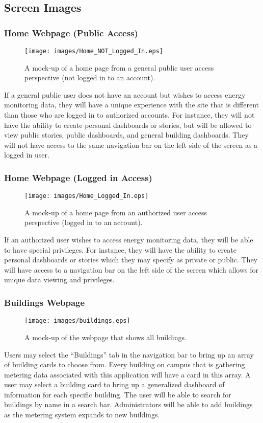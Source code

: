 \documentclass[journal,10pt,onecolumn,compsoc]{IEEEtran}
\begin{document}
	
    \subsection{Screen Images}
    
	\subsubsection{Home Webpage (Public Access)}
    \begin{figure}[H]
        \centering
        \texttt{[image: images/Home\_NOT\_Logged\_In.eps]}
        \caption{A mock-up of a home page from a general public user access perspective (not logged in to an account).}
    \end{figure}
	If a general public user does not have an account but wishes to access energy monitoring data, they will
	have a unique experience with the site that is different than those who are logged in to authorized accounts. 
	For instance, they will not have the ability to create personal dashboards or stories, but will be allowed to view
	public stories, public dashboards, and general building dashboards. They will not have access to the same navigation 
	bar on the left side of the screen as a logged in user. 
	
	\subsubsection{Home Webpage (Logged in Access)}
    \begin{figure}[H]
        \centering
        \texttt{[image: images/Home\_Logged\_In.eps]}
        \caption{A mock-up of a home page from an authorized user access perspective (logged in to an account).}
    \end{figure}
	If an authorized user wishes to access energy monitoring data, they will be able to have special privileges.
	For instance, they will have the ability to create personal dashboards or stories which they may specify as private or public.
	They will have access to a navigation bar on the left side of the screen which allows for unique data viewing and privileges. 
	
	
    \subsubsection{Buildings Webpage} 
    \begin{figure}[H]
        \centering
        \texttt{[image: images/buildings.eps]}
        \caption{A mock-up of the webpage that shows all buildings.}
    \end{figure}
	Users may select the ``Buildings'' tab in the navigation bar to bring up an array of building cards to choose from.
	Every building on campus that is gathering metering data associated with this application will have a card in this array.
	A user may select a building card to bring up a generalized dashboard of information for each specific building. 
	The user will be able to search for buildings by name in a search bar. Administrators will be able to add buildings as the metering system expands to new buildings.
	
\end{document}
